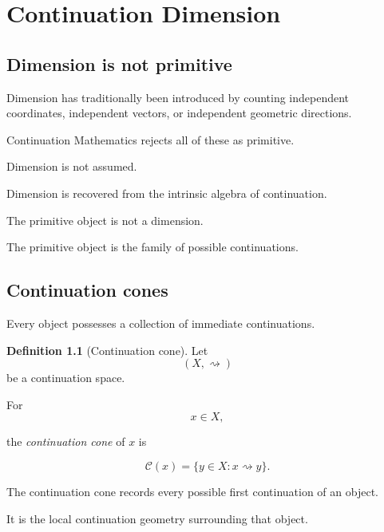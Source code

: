 \documentclass[13pt,openany]{book}
\theoremstyle{plain}
\theoremstyle{definition}
\newtheorem{definition}{Definition}[chapter]
\begin{document}
\chapter{Continuation Dimension}

\section{Dimension is not primitive}

Dimension has traditionally been introduced by counting independent coordinates,
independent vectors, or independent geometric directions.

Continuation Mathematics rejects all of these as primitive.

Dimension is not assumed.

Dimension is recovered from the intrinsic algebra of continuation.

The primitive object is not a dimension.

The primitive object is the family of possible continuations.


\section{Continuation cones}

Every object possesses a collection of immediate continuations.

\begin{definition}[Continuation cone]

Let
\[
(X,\rightsquigarrow)
\]
be a continuation space.

For
\[
x\in X,
\]

the \emph{continuation cone} of \(x\) is

\[
\mathcal C(x)
=
\{
y\in X:
x\rightsquigarrow y
\}.
\]

\end{definition}

The continuation cone records every possible first continuation of an object.

It is the local continuation geometry surrounding that object.

\end{document}
